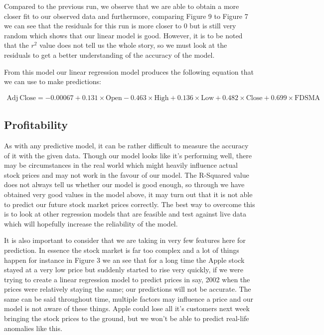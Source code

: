 \documentclass[11pt]{report}
\begin{document}
\vspace{0.3cm}
\noindent
Compared to the previous run, we observe that we are able to obtain a more closer fit to our observed data and furthermore, comparing Figure 9 to Figure 7 we can see that the residuals for this run is more closer to 0 but is still very random which shows that our linear model is good. However, it is to be noted that the $r^2$ value does not tell us the whole story, so we must look at the residuals to get a better understanding of the accuracy of the model.

\vspace{0.3cm}
\noindent
From this model our linear regression model produces the following equation that we can use to make predictions:

\begin{ceqn}
\begin{align*}
	\mathrm{Adj\ Close} = -0.00067 + 0.131\times\mathrm{Open} - 0.463\times\mathrm{High} + 0.136\times\mathrm{Low} + 0.482\times\mathrm{Close} + 0.699\times\mathrm{FDSMA}
\end{align*}
\end{ceqn}

\vspace{0.3cm}
\noindent
\subsection{Profitability}

\vspace{0.3cm}
\noindent
As with any predictive model, it can be rather difficult to measure the accuracy of it with the given data. Though our model looks like it's performing well, there may be circumstances in the real world which might heavily influence actual stock prices and may not work in the favour of our model. The R-Squared value does not always tell us whether our model is good enough, so through we have obtained very good values in the model above, it may turn out that it is not able to predict our future stock market prices correctly. The best way to overcome this is to look at other regression models that are feasible and test against live data which will hopefully increase the reliability of the model. 

\vspace{0.3cm}
\noindent
It is also important to consider that we are taking in very few features here for prediction. In essence the stock market is far too complex and a lot of things happen for instance in Figure 3 we an see that for a long time the Apple stock stayed at a very low price but suddenly started to rise very quickly, if we were trying to create a linear regression model to predict prices in say, 2002 when the prices were relatively staying the same; our predictions will not be accurate. The same can be said throughout time, multiple factors may influence a price and our model is not aware of these things. Apple could lose all it's customers next week bringing the stock prices to the ground, but we won't be able to predict real-life anomalies like this.
\end{document}
